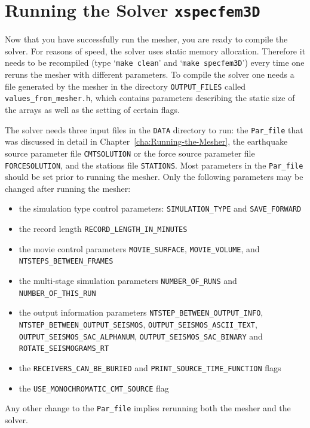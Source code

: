 \chapter{Running the Solver \texttt{xspecfem3D}}\label{cha:Running-the-Solver}

Now that you have successfully run the mesher, you are ready to compile
the solver. For reasons of speed, the solver uses static memory allocation.
Therefore it needs to be recompiled (type `\texttt{make clean}' and
`\texttt{make specfem3D}') every time one reruns the mesher with different
parameters. To compile the solver one needs a file generated by the
mesher in the directory \texttt{OUTPUT\_FILES} called \texttt{values\_from\_mesher.h},
which contains parameters describing the static size of the arrays
as well as the setting of certain flags.\newline


The solver needs three input files in the \texttt{DATA} directory
to run: the \texttt{Par\_file} that was discussed in detail in Chapter~\ref{cha:Running-the-Mesher},
the earthquake source parameter file \texttt{CMTSOLUTION} or the force source parameter file {\texttt{FORCESOLUTION}}, and the
stations file \texttt{STATIONS}. Most parameters in the \texttt{Par\_file}
should be set prior to running the mesher. Only the following parameters
may be changed after running the mesher:\newline

\begin{itemize}
\item the simulation type control parameters: \texttt{SIMULATION\_TYPE}
and \texttt{SAVE\_FORWARD}
\item the record length \texttt{RECORD\_LENGTH\_IN\_MINUTES}
\item the movie control parameters \texttt{MOVIE\_SURFACE}, \texttt{MOVIE\_VOLUME},
and \texttt{NTSTEPS\_BETWEEN\_FRAMES}
\item the multi-stage simulation parameters \texttt{NUMBER\_OF\_RUNS} and
\texttt{NUMBER\_OF\_THIS\_RUN}
\item the output information parameters \texttt{NTSTEP\_BETWEEN\_OUTPUT\_INFO},
\texttt{NTSTEP\_BETWEEN\_OUTPUT\_SEISMOS}, \texttt{OUTPUT\_SEISMOS\_ASCII\_TEXT},
\texttt{OUTPUT\_SEISMOS\_SAC\_ALPHANUM}, \texttt{OUTPUT\_SEISMOS\_SAC\_BINARY}
and \texttt{ROTATE\_SEISMOGRAMS\_RT}
\item the \texttt{RECEIVERS\_CAN\_BE\_BURIED} and \texttt{PRINT\_SOURCE\_TIME\_FUNCTION}
flags
\item the \texttt{USE\_MONOCHROMATIC\_CMT\_SOURCE} flag
\end{itemize}
Any other change to the \texttt{Par\_file} implies rerunning both
the mesher and the solver.\newline

